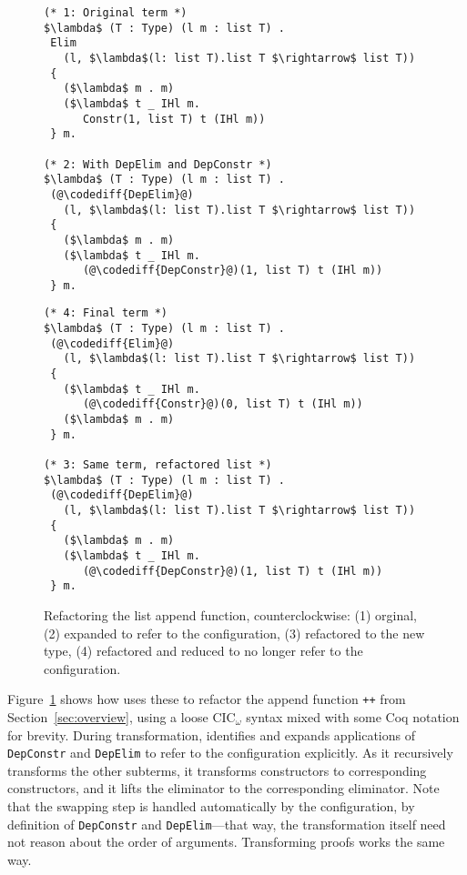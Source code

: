 \begin{figure}
\begin{minipage}{0.48\textwidth}
\begin{lstlisting}
(* 1: Original term *)
$\lambda$ (T : Type) (l m : list T) .
 Elim
   (l, $\lambda$(l: list T).list T $\rightarrow$ list T))
 {
   ($\lambda$ m . m)
   ($\lambda$ t _ IHl m.
      Constr(1, list T) t (IHl m))
 } m.
 
(* 2: With DepElim and DepConstr *)
$\lambda$ (T : Type) (l m : list T) .
 (@\codediff{DepElim}@)
   (l, $\lambda$(l: list T).list T $\rightarrow$ list T))
 {
   ($\lambda$ m . m)
   ($\lambda$ t _ IHl m.
      (@\codediff{DepConstr}@)(1, list T) t (IHl m))
 } m.
\end{lstlisting}
\end{minipage}
\hfill
\begin{minipage}{0.48\textwidth}
\begin{lstlisting}
(* 4: Final term *)
$\lambda$ (T : Type) (l m : list T) .
 (@\codediff{Elim}@)
   (l, $\lambda$(l: list T).list T $\rightarrow$ list T))
 {
   ($\lambda$ t _ IHl m.
      (@\codediff{Constr}@)(0, list T) t (IHl m))
   ($\lambda$ m . m)
 } m.

(* 3: Same term, refactored list *)
$\lambda$ (T : Type) (l m : list T) .
 (@\codediff{DepElim}@)
   (l, $\lambda$(l: list T).list T $\rightarrow$ list T))
 {
   ($\lambda$ m . m)
   ($\lambda$ t _ IHl m.
      (@\codediff{DepConstr}@)(1, list T) t (IHl m))
 } m.
\end{lstlisting}
\end{minipage}
\caption{Refactoring the list append function, counterclockwise: (1) orginal, (2) expanded to refer to the configuration, (3) refactored to the new type, (4) refactored and reduced to no longer refer to the configuration.}
\label{fig:appswap}
\end{figure}

Figure~\ref{fig:appswap} shows how \toolname uses these to refactor the append function \lstinline{++}
from Section~\ref{sec:overview}, using a loose CIC$_{\omega}$ syntax mixed with some Coq notation for brevity.
During transformation, \toolname identifies and expands applications of \lstinline{DepConstr} and \lstinline{DepElim}
to refer to the configuration explicitly.
As it recursively transforms the other subterms, it transforms constructors to corresponding constructors,
and it lifts the eliminator to the corresponding eliminator.
Note that the swapping step is handled automatically by the configuration, by definition of \lstinline{DepConstr}
and \lstinline{DepElim}---that way, the transformation itself need not reason about the order of arguments.
Transforming proofs works the same way.

